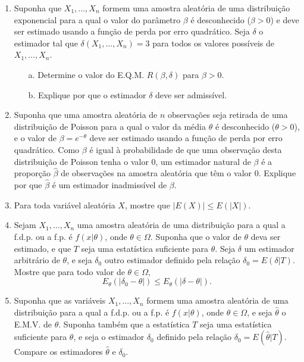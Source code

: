 \begin{enumerate}
    \item Suponha que $X_1, \dots, X_n$ formem uma amostra aleatória de uma distribuição exponencial para a qual o valor do parâmetro $\beta$ é desconhecido ($\beta > 0$) e deve ser estimado usando a função de perda por erro quadrático. Seja $\delta$ o estimador tal que $\delta(X_1, \dots, X_n)=3$ para todos os valores possíveis de $X_1, \dots, X_n$.
    \begin{enumerate}
        \item[a.] Determine o valor do E.Q.M. $R(\beta, \delta)$ para $\beta > 0$.
        \item[b.] Explique por que o estimador $\delta$ deve ser admissível.
    \end{enumerate}

    \item Suponha que uma amostra aleatória de $n$ observações seja retirada de uma distribuição de Poisson para a qual o valor da média $\theta$ é desconhecido ($\theta > 0$), e o valor de $\beta = e^{-\theta}$ deve ser estimado usando a função de perda por erro quadrático. Como $\beta$ é igual à probabilidade de que uma observação desta distribuição de Poisson tenha o valor 0, um estimador natural de $\beta$ é a proporção $\hat{\beta}$ de observações na amostra aleatória que têm o valor 0. Explique por que $\hat{\beta}$ é um estimador inadmissível de $\beta$.

    \item Para toda variável aleatória $X$, mostre que $|E(X)| \le E(|X|)$.

    \item Sejam $X_1, \dots, X_n$ uma amostra aleatória de uma distribuição para a qual a f.d.p. ou a f.p. é $f(x|\theta)$, onde $\theta \in \Omega$. Suponha que o valor de $\theta$ deva ser estimado, e que $T$ seja uma estatística suficiente para $\theta$. Seja $\delta$ um estimador arbitrário de $\theta$, e seja $\delta_0$ outro estimador definido pela relação $\delta_0 = E(\delta|T)$. Mostre que para todo valor de $\theta \in \Omega$,
    \[ E_\theta(|\delta_0 - \theta|) \le E_\theta(|\delta - \theta|). \]

    \item Suponha que as variáveis $X_1, \dots, X_n$ formem uma amostra aleatória de uma distribuição para a qual a f.d.p. ou a f.p. é $f(x|\theta)$, onde $\theta \in \Omega$, e seja $\hat{\theta}$ o E.M.V. de $\theta$. Suponha também que a estatística $T$ seja uma estatística suficiente para $\theta$, e seja o estimador $\delta_0$ definido pela relação $\delta_0 = E(\hat{\theta}|T)$. Compare os estimadores $\hat{\theta}$ e $\delta_0$.


\end{enumerate}
